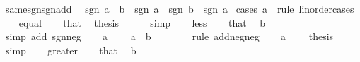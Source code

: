 \begin{isabellebody}
\isanewline
%
\endisadelimproof
\isanewline
{}\isamarkupfalse%
\ same{\isacharunderscore}{\kern0pt}sgn{\isacharunderscore}{\kern0pt}sgn{\isacharunderscore}{\kern0pt}add{\isacharcolon}{\kern0pt}\isanewline
\ \ {\isachardoublequoteopen}sgn\ {\isacharparenleft}{\kern0pt}a\ {\isacharplus}{\kern0pt}\ b{\isacharparenright}{\kern0pt}\ {\isacharequal}{\kern0pt}\ sgn\ a{\isachardoublequoteclose}\ \ {\isachardoublequoteopen}sgn\ b\ {\isacharequal}{\kern0pt}\ sgn\ a{\isachardoublequoteclose}\isanewline
%
\isadelimproof
%
\endisadelimproof
%
\isatagproof
{}\isamarkupfalse%
\ {\isacharparenleft}{\kern0pt}cases\ a\ {}\ rule{\isacharcolon}{\kern0pt}\ linorder{\isacharunderscore}{\kern0pt}cases{\isacharparenright}{\kern0pt}\isanewline
\ \ \isamarkupfalse%
\ equal\isanewline
\ \ \isamarkupfalse%
\ that\ \isamarkupfalse%
\ {\isacharquery}{\kern0pt}thesis\isanewline
\ \ \ \ \isamarkupfalse%
\ simp\isanewline
{}\isamarkupfalse%
\isanewline
\ \ \isamarkupfalse%
\ less\isanewline
\ \ \isamarkupfalse%
\ that\ \isamarkupfalse%
\ {\isachardoublequoteopen}b\ {\isacharless}{\kern0pt}\ {}{\isachardoublequoteclose}\isanewline
\ \ \ \ \isamarkupfalse%
\ {\isacharparenleft}{\kern0pt}simp\ add{\isacharcolon}{\kern0pt}\ sgn{\isacharunderscore}{\kern0pt}{}{\isacharunderscore}{\kern0pt}neg{\isacharparenright}{\kern0pt}\isanewline
\ \ \isamarkupfalse%
\ {\isacartoucheopen}a\ {\isacharless}{\kern0pt}\ {}{\isacartoucheclose}\ \isamarkupfalse%
\ {\isachardoublequoteopen}a\ {\isacharplus}{\kern0pt}\ b\ {\isacharless}{\kern0pt}\ {}{\isachardoublequoteclose}\isanewline
\ \ \ \ \isamarkupfalse%
\ {\isacharparenleft}{\kern0pt}rule\ add{\isacharunderscore}{\kern0pt}neg{\isacharunderscore}{\kern0pt}neg{\isacharparenright}{\kern0pt}\isanewline
\ \ \isamarkupfalse%
\ {\isacartoucheopen}a\ {\isacharless}{\kern0pt}\ {}{\isacartoucheclose}\ \isamarkupfalse%
\ {\isacharquery}{\kern0pt}thesis\isanewline
\ \ \ \ \isamarkupfalse%
\ simp\isanewline
{}\isamarkupfalse%
\isanewline
\ \ \isamarkupfalse%
\ greater\isanewline
\ \ \isamarkupfalse%
\ that\ \isamarkupfalse%
\ {\isachardoublequoteopen}b\ {\isachargreater}{\kern0pt}\ {}{\isachardoublequoteclose}\isanewline
\ \ \ \ \isamarkupfalse%

\end{isabellebody}

